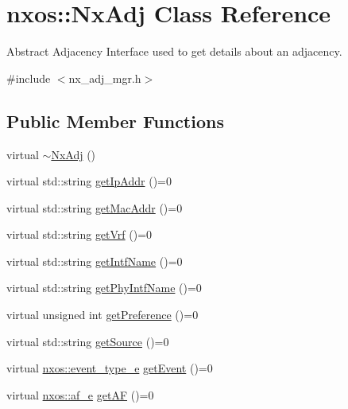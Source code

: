 \hypertarget{classnxos_1_1_nx_adj}{}\section{nxos\+:\+:Nx\+Adj Class Reference}
\label{classnxos_1_1_nx_adj}


Abstract Adjacency Interface used to get details about an adjacency.  




{\ttfamily \#include $<$nx\+\_\+adj\+\_\+mgr.\+h$>$}

\subsection*{Public Member Functions}
\begin{DoxyCompactItemize}
\item 
virtual \mbox{\hyperlink{classnxos_1_1_nx_adj_a308082669b2c45fe0bc3ae8ceedacdb6}{$\sim$\+Nx\+Adj}} ()
\item 
virtual std\+::string \mbox{\hyperlink{classnxos_1_1_nx_adj_a21e819518fd33c40436a6e2df427f064}{get\+Ip\+Addr}} ()=0
\item 
virtual std\+::string \mbox{\hyperlink{classnxos_1_1_nx_adj_ad35857c95529b40fbaf363bd6aebc0ec}{get\+Mac\+Addr}} ()=0
\item 
virtual std\+::string \mbox{\hyperlink{classnxos_1_1_nx_adj_a0928d29814a978c7b8b825fcc99b1fb1}{get\+Vrf}} ()=0
\item 
virtual std\+::string \mbox{\hyperlink{classnxos_1_1_nx_adj_ada50b00bb73ea35a3282481c949187d2}{get\+Intf\+Name}} ()=0
\item 
virtual std\+::string \mbox{\hyperlink{classnxos_1_1_nx_adj_aaf3b120882857af70467cd02dc01a844}{get\+Phy\+Intf\+Name}} ()=0
\item 
virtual unsigned int \mbox{\hyperlink{classnxos_1_1_nx_adj_a53629d8a995e5ab54ed63d175f5ab6cf}{get\+Preference}} ()=0
\item 
virtual std\+::string \mbox{\hyperlink{classnxos_1_1_nx_adj_a1f60bed95c387db33eba7ae4b48c965d}{get\+Source}} ()=0
\item 
virtual \mbox{\hyperlink{nx__common_8h_af9a9040b7681199d386e94eb888018cb}{nxos\+::event\+\_\+type\+\_\+e}} \mbox{\hyperlink{classnxos_1_1_nx_adj_a75c503c316c39c12aa8b4c431c81d2de}{get\+Event}} ()=0
\item 
virtual \mbox{\hyperlink{nx__common_8h_a3a667f48b94db10aa398940dc5bf72d7}{nxos\+::af\+\_\+e}} \mbox{\hyperlink{classnxos_1_1_nx_adj_a5e026c5187f3a88337790ad5d7cb4e5b}{get\+AF}} ()=0

\end{DoxyCompactItemize}
